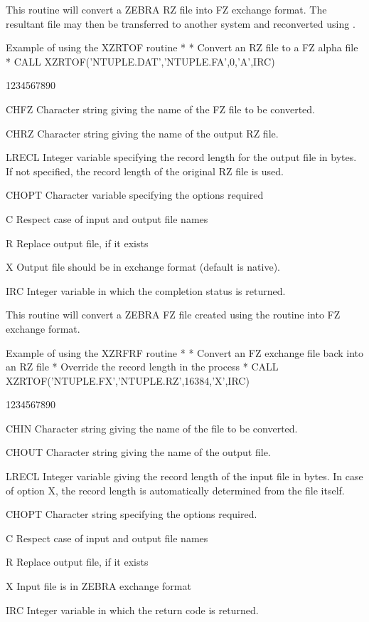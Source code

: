 This routine will convert a ZEBRA RZ file into FZ exchange format.
The resultant file may then be transferred to another system
and reconverted using .
\begin{XMPt}{Example of using the XZRTOF routine}
*
*     Convert an RZ file to a FZ alpha file
*
      CALL XZRTOF('NTUPLE.DAT','NTUPLE.FA',0,'A',IRC)
\end{XMPt}
\begin{DLtt}{1234567890}
\item[CHFZ]Character string giving the name of the FZ file
to be converted.
\item[CHRZ]Character string giving the name of the output
RZ file.
\item[LRECL]Integer variable specifying the record length
for the output file in bytes. If not specified, the record
length of the original RZ file is used.
\item[CHOPT]Character variable specifying the options required
\begin{DLtt}{12}
\item[C]Respect case of input and output file names
\item[R]Replace output file, if it exists
\item[X]Output file should be in exchange format (default is native).
\end{DLtt}
\item[IRC]Integer variable in which the completion status is
returned.
\end{DLtt}
\par
This routine will convert a ZEBRA FZ file created using
the routine  into FZ exchange format.
\begin{XMPt}{Example of using the XZRFRF routine}
*
*     Convert an FZ exchange file back into an RZ file
*     Override the record length in the process
*
      CALL XZRTOF('NTUPLE.FX','NTUPLE.RZ',16384,'X',IRC)
\end{XMPt}
\begin{DLtt}{1234567890}
\item[CHIN]Character string giving the name of the file
to be converted.
\item[CHOUT]Character string giving the name of the output
file.
\item[LRECL]Integer variable giving the record length of the
input file in bytes. In case of option X, the record length
is automatically determined from the file itself.
\item[CHOPT]Character string specifying the options required.
\begin{DLtt}{12}
\item[C]Respect case of input and output file names
\item[R]Replace output file, if it exists
\item[X]Input file is in ZEBRA exchange format
\end{DLtt}
\item[IRC]Integer variable in which the return code is returned.
\end{DLtt}
